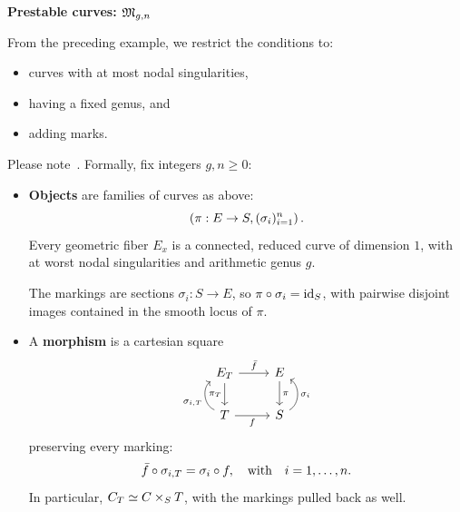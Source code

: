 \documentclass[12pt]{memoir}
\begin{document}
\begin{ptcb}
    \textbf{Prestable curves: \(\mathfrak{M}_{g,n}\)}\par
    From the preceding example, we restrict the conditions to:
    \begin{itemize}
        \item curves with at most nodal singularities,
        \item having a fixed genus, and
        \item adding marks.
    \end{itemize}
    Please note~\cite{notes:stacks-prestable,notes:fantechi-gw}. Formally, fix integers \(g,n\geq 0\):
    \begin{itemize}
        \item \textbf{Objects} are families of curves as above:
        \[
            \left(\pi:E\to S,(\sigma_i)_{i=1}^n\right).
        \]
        Every geometric fiber \(E_{x}\) is a connected, reduced curve of dimension \(1\), with at worst nodal singularities and arithmetic genus \(g\).\par
        The markings are sections \(\sigma_i:S\to E\), so \(\pi\circ\sigma_i=\operatorname{id}_S\), with pairwise disjoint images contained in the smooth locus of \(\pi\).\par 
        \item A \textbf{morphism} is a cartesian square
        \[
            \begin{tikzcd}
                E_T \arrow[d, "\pi_T"'] \arrow[r, "\bar f"]              & E \arrow[d, "\pi"]                   \\
                T \arrow[r, "f"'] \arrow[u, "{\sg_{i,T}}", bend left=60] & S \arrow[u, "\sg_i"', bend right=60]
            \end{tikzcd}
        \]
        preserving every marking:
        \[
            \bar f\circ\sigma_{i,T}=\sigma_i\circ f,
            \quad\text{with}\quad i=1,\ldots,n.
        \]
        In particular, \(C_T\simeq C\times_S T\), with the markings pulled back as well.
    \end{itemize}
\end{ptcb}
\end{document}
